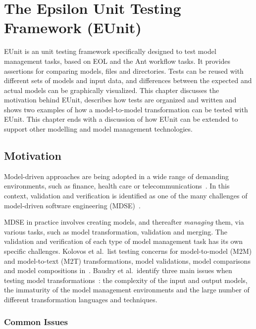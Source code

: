 \clearpage
\chapter{The Epsilon Unit Testing Framework (EUnit)}
\label{chp:eunit}

EUnit is an unit testing framework specifically designed to test model management tasks, based on EOL and the Ant workflow tasks. It provides assertions for comparing models, files and directories. Tests can be reused with different sets of models and input data, and differences between the expected and actual models can be graphically visualized. This chapter discusses the motivation behind EUnit, describes how tests are organized and written and shows two examples of how a model-to-model transformation can be tested with EUnit. This chapter ends with a discussion of how EUnit can be extended to support other modelling and model management technologies.

\section{Motivation}
\label{sec:eunit-motiv-test-model}

Model-driven approaches are being adopted in a wide range of demanding environments, such as finance, health care or telecommunications~\cite{Guttman2006}. In this context, validation and verification is identified as one of the many challenges of model-driven software engineering (MDSE)~\cite{Chaudron2009}.

MDSE in practice involves creating models, and thereafter \textit{managing} them, via various tasks, such as model transformation, validation and merging.  The validation and verification of each type of model management task has its own specific challenges. Kolovos et al.\ list testing concerns for model-to-model (M2M) and model-to-text (M2T) transformations, model validations, model comparisons and model compositions in~\cite{EUnit}. Baudry et al.\ identify three main issues when testing model transformations~\cite{Baudry2010}: the complexity of the input and output models, the immaturity of the model management environments and the large number of different transformation languages and techniques.

\subsection{Common Issues}
\label{sec:eunit-common-issues}

